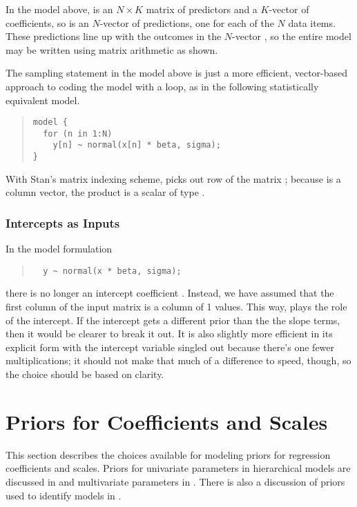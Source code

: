 In the model above,  is an $N \times K$ matrix of predictors
and  a $K$-vector of coefficients, so  is an
$N$-vector of predictions, one for each of the $N$ data items.  These
predictions line up with the outcomes in the $N$-vector , so
the entire model may be written using matrix arithmetic as shown.

The sampling statement in the model above is just a more efficient,
vector-based approach to coding the model with a loop, as in the
following statistically equivalent model.
%
\begin{quote}
\begin{Verbatim}
model {
  for (n in 1:N)
    y[n] ~ normal(x[n] * beta, sigma);
}
\end{Verbatim}
\end{quote}
%
With Stan's matrix indexing scheme,  picks out row 
of the matrix ;  because  is a column vector, 
the product  is a scalar of type .

\subsubsection{Intercepts as Inputs}

In the model formulation
%
\begin{quote}
\begin{Verbatim}
  y ~ normal(x * beta, sigma);
\end{Verbatim}
\end{quote}
%
there is no longer an intercept coefficient .  Instead, we
have assumed that the first column of the input matrix  is a
column of 1 values.  This way,  plays the role of the
intercept.  If the intercept gets a different prior than the the slope
terms, then it would be clearer to break it out.  It is also slightly
more efficient in its explicit form with the intercept variable
singled out because there's one fewer multiplications; it should not
make that much of a difference to speed, though, so the choice should
be based on clarity.


\section{Priors for Coefficients and Scales}\label{regression-priors.section}

This section describes the choices available for modeling priors for
regression coefficients and scales.  Priors for univariate parameters
in hierarchical models are discussed in
 and multivariate parameters in
. There is also a
discussion of priors used to identify models in
.

